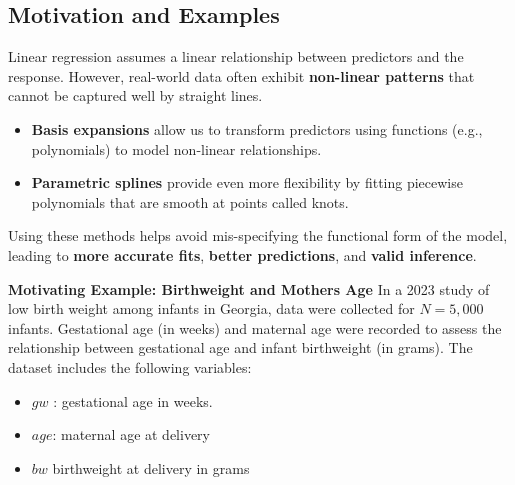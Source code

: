 \documentclass[
  letterpaper,
  DIV=11,
  numbers=noendperiod]{scrreprt}
\providecommand{\tightlist}{%
  \setlength{\itemsep}{0pt}\setlength{\parskip}{0pt}}\usepackage{longtable,booktabs,array}
\begin{document}
\hypertarget{motivation-and-examples-7}{%
\subsection*{Motivation and Examples}\label{motivation-and-examples-7}}

\begin{tcolorbox}[enhanced jigsaw, breakable, colbacktitle=quarto-callout-important-color!10!white, left=2mm, colframe=quarto-callout-important-color-frame, opacityback=0, coltitle=black, colback=white, rightrule=.15mm, title=\textcolor{quarto-callout-important-color}{\faExclamation}\hspace{0.5em}{Motivation:}, titlerule=0mm, opacitybacktitle=0.6, leftrule=.75mm, toprule=.15mm, arc=.35mm, bottomtitle=1mm, toptitle=1mm, bottomrule=.15mm]

Linear regression assumes a linear relationship between predictors and
the response. However, real-world data often exhibit \textbf{non-linear
patterns} that cannot be captured well by straight lines.

\begin{itemize}
\tightlist
\item
  \textbf{Basis expansions} allow us to transform predictors using
  functions (e.g., polynomials) to model non-linear relationships.
\item
  \textbf{Parametric splines} provide even more flexibility by fitting
  piecewise polynomials that are smooth at points called knots.
\end{itemize}

Using these methods helps avoid mis-specifying the functional form of
the model, leading to \textbf{more accurate fits}, \textbf{better
predictions}, and \textbf{valid inference}.

\end{tcolorbox}

\textbf{Motivating Example: Birthweight and Mothers Age} In a 2023 study
of low birth weight among infants in Georgia, data were collected for
\(N = 5{,}000\) infants. Gestational age (in weeks) and maternal age
were recorded to assess the relationship between gestational age and
infant birthweight (in grams). The dataset includes the following
variables:

\begin{itemize}
\item
  \(gw\) : gestational age in weeks.
\item
  \(age\): maternal age at delivery
\item
  \(bw\) birthweight at delivery in grams
\end{itemize}
\end{document}
